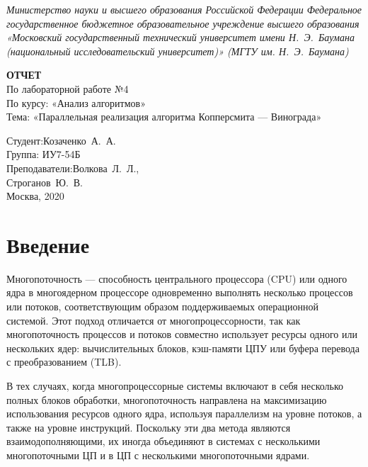 \documentclass[a4paper,14pt]{extreport}
\begin{document}
\begin{titlepage}
	\centering
	
	{\footnotesize\itshape Министерство науки и высшего образования
		Российской Федерации Федеральное государственное бюджетное
		образовательное учреждение высшего образования «Московский
		государственный технический университет имени Н.~Э.~Баумана
		(национальный исследовательский университет)» (МГТУ им. Н.~Э.~Баумана)
		\\}
	
	\vspace{60mm}
	
	\textbf{ОТЧЕТ}\\
	По лабораторной работе №4\\
	По курсу: «Анализ алгоритмов»\\
	Тема: «Параллельная реализация алгоритма Копперсмита — Винограда»\\
	
	\vspace{60mm}
	
	\hspace{70mm} Студент:\hfill Козаченко~А.~А.\\
	\hspace{70mm} Группа: \hfill ИУ7-54Б\\
	\hspace{70mm} Преподаватели:\hfill Волкова~Л.~Л.,\\
	\hfill Строганов~Ю.~В.\\
	
	\vfill
	Москва, 2020
\end{titlepage}

\tableofcontents

\chapter*{Введение}

Многопоточность — способность центрального процессора (CPU) или одного ядра в многоядерном процессоре одновременно выполнять несколько процессов или потоков, соответствующим образом поддерживаемых операционной системой.
Этот подход отличается от многопроцессорности, так как многопоточность процессов и потоков совместно использует ресурсы одного или нескольких ядер: вычислительных блоков, кэш-памяти ЦПУ или буфера перевода с преобразованием (TLB).

В тех случаях, когда многопроцессорные системы включают в себя несколько полных блоков обработки, многопоточность направлена на максимизацию использования ресурсов одного ядра, используя параллелизм на уровне потоков, а также на уровне инструкций.
Поскольку эти два метода являются взаимодополняющими, их иногда объединяют в системах с несколькими многопоточными ЦП и в ЦП с несколькими многопоточными ядрами.
\end{document}
